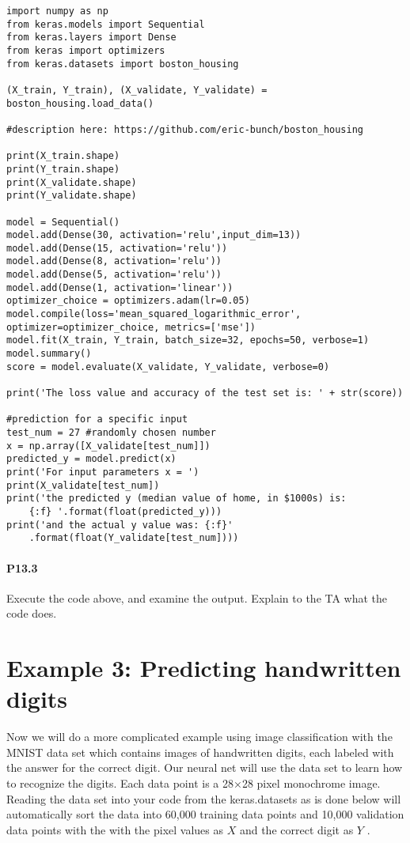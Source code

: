 \begin{lstlisting}
import numpy as np
from keras.models import Sequential
from keras.layers import Dense
from keras import optimizers
from keras.datasets import boston_housing

(X_train, Y_train), (X_validate, Y_validate) = boston_housing.load_data()

#description here: https://github.com/eric-bunch/boston_housing

print(X_train.shape)
print(Y_train.shape)
print(X_validate.shape)
print(Y_validate.shape)

model = Sequential()
model.add(Dense(30, activation='relu',input_dim=13))
model.add(Dense(15, activation='relu'))
model.add(Dense(8, activation='relu'))
model.add(Dense(5, activation='relu'))
model.add(Dense(1, activation='linear'))
optimizer_choice = optimizers.adam(lr=0.05)
model.compile(loss='mean_squared_logarithmic_error',
optimizer=optimizer_choice, metrics=['mse'])
model.fit(X_train, Y_train, batch_size=32, epochs=50, verbose=1)
model.summary()
score = model.evaluate(X_validate, Y_validate, verbose=0)

print('The loss value and accuracy of the test set is: ' + str(score))

#prediction for a specific input
test_num = 27 #randomly chosen number
x = np.array([X_validate[test_num]])
predicted_y = model.predict(x)
print('For input parameters x = ')
print(X_validate[test_num])
print('the predicted y (median value of home, in $1000s) is:
	{:f} '.format(float(predicted_y)))
print('and the actual y value was: {:f}'
	.format(float(Y_validate[test_num])))
\end{lstlisting}
\paragraph*{P13.3} Execute the code above, and examine the output. Explain to the TA what
the code does.


\section*{Example 3: Predicting handwritten digits}
Now we will do a more complicated example using image classification with the
MNIST data set which contains images of handwritten digits, each labeled with
the answer for the correct digit. Our neural net will use the data set to learn how
to recognize the digits. Each data point is a 28×28 pixel monochrome image.
Reading the data set into your code from the keras.datasets as is done below will
automatically sort the data into 60,000 training data points and 10,000 validation
data points with the with the pixel values as $X$ and the correct digit as $Y$ .\\

